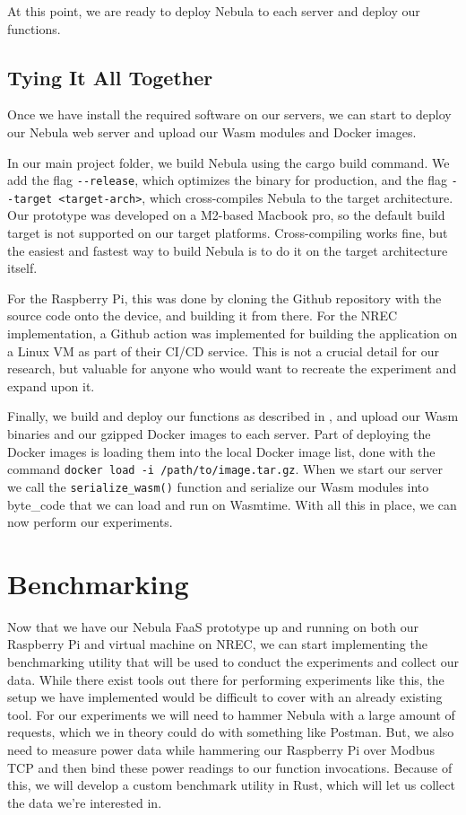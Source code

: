 \documentclass[
  table]{report}
\begin{document}
At this point, we are ready to deploy Nebula to each server and deploy
our functions.

\subsection{Tying It All Together}

Once we have install the required software on our servers, we can start
to deploy our Nebula web server and upload our \ac{Wasm} modules and
Docker images.

In our main project folder, we build Nebula using the cargo build
command. We add the flag \texttt{-\/-release}, which optimizes the
binary for production, and the flag
\texttt{-\/-target\ \textless{}target-arch\textgreater{}}, which
cross-compiles Nebula to the target architecture. Our prototype was
developed on a M2-based Macbook pro, so the default build target is not
supported on our target platforms. Cross-compiling works fine, but the
easiest and fastest way to build Nebula is to do it on the target
architecture itself.

For the Raspberry Pi, this was done by cloning the Github repository
with the source code onto the device, and building it from there. For
the \ac{NREC} implementation, a Github action was implemented for
building the application on a Linux VM as part of their CI/CD service.
This is not a crucial detail for our research, but valuable for anyone
who would want to recreate the experiment and expand upon it.

Finally, we build and deploy our functions as described in
, and upload our \ac{Wasm} binaries and our
gzipped Docker images to each server. Part of deploying the Docker
images is loading them into the local Docker image list, done with the
command \texttt{docker\ load\ -i\ /path/to/image.tar.gz}. When we start
our server we call the \texttt{serialize\_wasm()} function and serialize
our \ac{Wasm} modules into byte\_code that we can load and run on
Wasmtime. With all this in place, we can now perform our experiments.

\section{Benchmarking}
\label{sect:impl_bench}

Now that we have our Nebula \ac{FaaS} prototype up and running on both
our Raspberry Pi and virtual machine on \ac{NREC}, we can start
implementing the benchmarking utility that will be used to conduct the
experiments and collect our data. While there exist tools out there for
performing experiments like this, the setup we have implemented would be
difficult to cover with an already existing tool. For our experiments we
will need to hammer Nebula with a large amount of requests, which we in
theory could do with something like Postman. But, we also need to
measure power data while hammering our Raspberry Pi over Modbus TCP and
then bind these power readings to our function invocations. Because of
this, we will develop a custom benchmark utility in Rust, which will let
us collect the data we're interested in.
\end{document}
